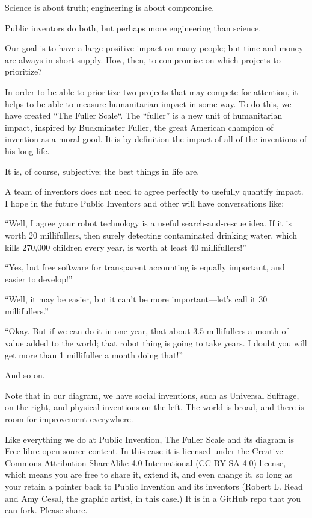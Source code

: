 \documentclass[
	fontsize=10pt, %
	twoside=false, %
	secnumdepth=1, %
]{kaobook}
\begin{document}
Science is about truth; engineering is about compromise.

Public inventors do both, but perhaps more engineering than
science.

Our goal is to have a large positive impact on many people; but time
and money are always in short supply.  How, then, to compromise on
which projects to prioritize?

In order to be able to prioritize two
projects that may compete for attention, it helps to be able to measure
humanitarian impact in some way.
To do this, we have created “The
Fuller Scale“. The “fuller” is a new unit of humanitarian impact,
inspired by Buckminster Fuller, the great American champion of
invention as a moral good. It is by definition the impact of all of
the inventions of his long life.

It is, of course, subjective; the best things in life are.

A team of inventors does not need to agree perfectly to usefully
quantify impact. I hope in the future Public Inventors and other will
have conversations like:

“Well, I agree your robot technology is a useful search-and-rescue
idea. If it is worth 20 millifullers, then surely detecting
contaminated drinking water, which kills 270,000 children every year,
is worth at least 40 millifullers!”

“Yes, but free software for transparent accounting is equally
important, and easier to develop!”

“Well, it may be easier, but it can’t be more important—let’s call it
30 millifullers.”

“Okay. But if we can do it in one year, that about 3.5 millifullers a
month of value added to the world; that robot thing is going to take
years. I doubt you will get more than 1 millifuller a month doing
that!”

And so on.

Note that in our diagram, we have social inventions, such as Universal
Suffrage, on the right, and physical inventions on the left. The world
is broad, and there is room for improvement everywhere.

Like everything we do at Public Invention, The Fuller Scale and its
diagram is Free-libre open source content.
In this case it is licensed
under the Creative Commons Attribution-ShareAlike 4.0 International
(CC BY-SA 4.0) license, which means you are free to share it, extend
it, and even change it, so long as your retain a pointer back to
Public Invention and its inventors (Robert L. Read and Amy Cesal, the
graphic artist, in this case.) It is in a GitHub repo that you can
fork. Please share.
\end{document}
